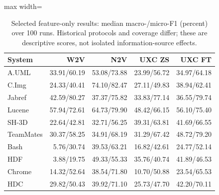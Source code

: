 \begin{table}[t]
\centering\small
\caption{Selected feature-only results: median macro-/micro-F1 (percent) over 100 runs. Historical protocols and coverage differ; these are descriptive scores, not isolated information-source effects.\label{tab:rq2_mlp_features}}
\begin{adjustbox}{max width=\columnwidth}
\begin{tabular}{lrrrr}
\toprule
System & W2V & N2V & UXC ZS & UXC FT \\
\midrule
A.UML & 33.91/60.19 & 53.08/73.88 & 23.99/56.72 & 34.97/64.18 \\
C.Img & 24.33/40.41 & 74.10/82.47 & 27.11/49.83 & 38.94/62.41 \\
Jabref & 42.59/80.27 & 37.37/75.82 & 33.83/77.14 & 36.55/79.74 \\
Lucene & 57.94/72.61 & 64.73/79.90 & 48.42/66.15 & 56.10/75.40 \\
SH-3D & 22.64/42.81 & 32.71/56.25 & 39.31/63.81 & 41.69/66.55 \\
TeamMates & 30.37/58.25 & 34.91/68.19 & 31.29/67.42 & 48.72/79.20 \\
Bash & 5.76/30.74 & 39.53/63.21 & 16.82/42.61 & 24.77/52.14 \\
HDF & 3.88/19.75 & 49.33/55.33 & 35.76/40.74 & 41.89/46.53 \\
Chrome & 14.32/52.64 & 38.54/71.80 & 10.70/50.88 & 23.54/65.53 \\
HDC & 29.82/50.43 & 39.92/71.10 & 25.73/47.70 & 42.20/70.11 \\
\bottomrule
\end{tabular}
\end{adjustbox}
\end{table}
